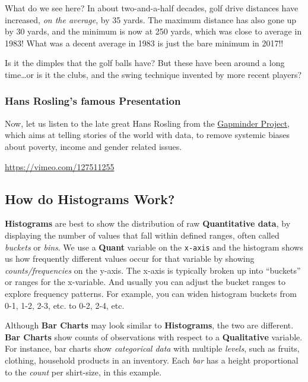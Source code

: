 \documentclass[
  letterpaper,
  DIV=11,
  numbers=noendperiod,
  oneside]{scrartcl}
\begin{document}
What do we see here? In about two-and-a-half decades, golf drive
distances have increased, \emph{on the average}, by 35 yards. The
maximum distance has also gone up by 30 yards, and the minimum is now at
250 yards, which was close to average in 1983! What was a decent average
in 1983 is just the bare minimum in 2017!!

Is it the dimples that the golf balls have? But these have been around a
long time\ldots or is it the clubs, and the swing technique invented by
more recent players?

\subsubsection{Hans Rosling's famous
Presentation}\label{hans-roslings-famous-presentation}

Now, let us listen to the late great Hans Rosling from the
\href{https://www.gapminder.org}{Gapminder Project}, which aims at
telling stories of the world with data, to remove systemic biases about
poverty, income and gender related issues.

\url{https://vimeo.com/127511255}

\subsection{\texorpdfstring{ How do Histograms
Work?}{ How do Histograms Work?}}\label{how-do-histograms-work}

\textbf{Histograms} are best to show the distribution of raw
\textbf{Quantitative data}, by displaying the number of values that fall
within defined ranges, often called \emph{buckets} or \emph{bins}. We
use a \textbf{Quant} variable on the \texttt{x-axis} and the histogram
shows us how frequently different values occur for that variable by
showing \emph{counts/frequencies} on the y-axis. The x-axis is typically
broken up into ``buckets'' or ranges for the x-variable. And usually you
can adjust the bucket ranges to explore frequency patterns. For example,
you can widen histogram buckets from 0-1, 1-2, 2-3, etc. to 0-2, 2-4,
etc.

Although \textbf{Bar Charts} may look similar to \textbf{Histograms},
the two are different. \textbf{Bar Charts} show counts of observations
with respect to a \textbf{Qualitative} variable. For instance, bar
charts show \emph{categorical data} with multiple \emph{levels}, such as
fruits, clothing, household products in an inventory. Each \emph{bar}
has a height proportional to the \emph{count} per shirt-size, in this
example.
\end{document}
